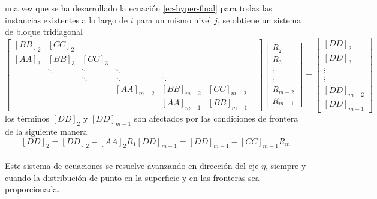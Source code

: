 \documentclass[letterpaper, openright, 12pt]{book}
\begin{document}
		 una vez que se ha desarrollado la ecuación \ref{ec-hyper-final} para todas las instancias existentes a lo largo de $i$ para un mismo nivel $j$, se obtiene un sistema de bloque tridiagonal
		 \begin{equation}
			 \begin{bmatrix}
				 \left[ BB \right]_2 & \left[ CC \right]_2 & & & & \\
				 \left[AA\right]_3 & \left[BB\right]_3 & \left[CC\right]_3 & & & \\
				 & \ddots & \ddots &  \ddots & & \\
				 & & \ddots & \ddots & \ddots & & \\
				 & & & \left[AA\right]_{m-2} & \left[BB\right]_{m-2} & \left[CC\right]_{m-2}\\
				 & & & & \left[AA\right]_{m-1} & \left[BB\right]_{m-1}
			 \end{bmatrix}
			 \begin{bmatrix}
				 R_{2}\\
				 R_{3}\\
				 \vdots\\
				 \vdots\\
				 R_{m-2}\\
				 R_{m-1}
			 \end{bmatrix}
			 = \begin{bmatrix}
				 \left[DD\right]_2\\
				 \left[DD\right]_3\\
				 \vdots\\
				 \vdots\\
				 \left[DD\right]_{m-2}\\
				 \left[DD\right]_{m-1}
			 \end{bmatrix}
		 \end{equation}
		 los términos $\left[DD\right]_2$ y $\left[DD\right]_{m - 1}$ son afectados por las condiciones de frontera de la siguiente manera
		 \begin{subequations}
		 	\begin{equation*}
			 	\left[DD\right]_2 = \left[DD\right]_2 - \left[AA\right]_2 R_1
		 	\end{equation*}
		 	\begin{equation*}
			 	\left[DD\right]_{m - 1} = \left[DD\right]_{m - 1} - \left[CC\right]_{m - 1} R_{m}
		 	\end{equation*}
		 \end{subequations}
		
	\paragraph*{}
		Este sistema de ecuaciones se resuelve avanzando en dirección del eje $\eta$, siempre y cuando la distribución de punto en la superficie y en las fronteras sea proporcionada.
		
\end{document}
